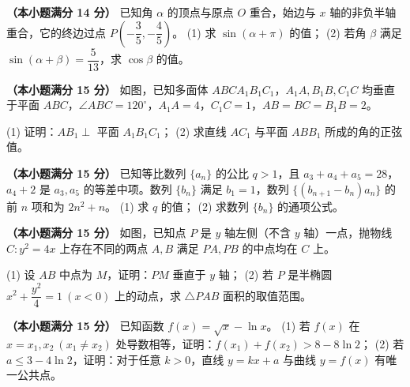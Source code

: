 \begin{question}
\textbf{（本小题满分 14 分）} 
已知角 $\alpha$ 的顶点与原点 $O$ 重合，始边与 $x$ 轴的非负半轴重合，它的终边过点 $P\left(-\dfrac35, -\dfrac45\right)$。
(1) 求 $\sin(\alpha + \pi)$ 的值；
(2) 若角 $\beta$ 满足 $\sin(\alpha + \beta) = \dfrac{5}{13}$，求 $\cos\beta$ 的值。

\Needspace{0.4\textheight}
\end{question}
\begin{question}
\textbf{（本小题满分 15 分）} 
如图，已知多面体 $ABCA_1B_1C_1$，$A_1A, B_1B, C_1C$ 均垂直于平面 $ABC$，$\angle ABC = 120^\circ$，$A_1A = 4$，$C_1C = 1$，$AB = BC = B_1B = 2$。
\nopagebreak[4]
\begin{center}\end{center}
\nopagebreak[4]
(1) 证明：$AB_1 \perp$ 平面 $A_1B_1C_1$；
(2) 求直线 $AC_1$ 与平面 $ABB_1$ 所成的角的正弦值。

\end{question}
\begin{question}
\textbf{（本小题满分 15 分）} 
已知等比数列 $\{a_n\}$ 的公比 $q > 1$，且 $a_3 + a_4 + a_5 = 28$，$a_4 + 2$ 是 $a_3, a_5$ 的等差中项。数列 $\{b_n\}$ 满足 $b_1 = 1$，数列 $\{(b_{n+1} - b_n)a_n\}$ 的前 $n$ 项和为 $2n^2 + n$。
(1) 求 $q$ 的值；
(2) 求数列 $\{b_n\}$ 的通项公式。

\Needspace{0.4\textheight}
\end{question}
\begin{question}
\textbf{（本小题满分 15 分）} 
如图，已知点 $P$ 是 $y$ 轴左侧（不含 $y$ 轴）一点，抛物线 $C\colon y^2 = 4x$ 上存在不同的两点 $A, B$ 满足 $PA, PB$ 的中点均在 $C$ 上。
\nopagebreak[4]
\begin{center}\end{center}
\nopagebreak[4]
(1) 设 $AB$ 中点为 $M$，证明：$PM$ 垂直于 $y$ 轴；
(2) 若 $P$ 是半椭圆 $x^2 + \dfrac{y^2}{4} = 1\ (x < 0)$ 上的动点，求 $\triangle PAB$ 面积的取值范围。

\end{question}
\begin{question}
\textbf{（本小题满分 15 分）} 
已知函数 $f(x) = \sqrt x - \ln x$。
(1) 若 $f(x)$ 在 $x = x_1, x_2\ (x_1 \neq x_2)$ 处导数相等，证明：$f(x_1) + f(x_2) > 8 - 8\ln 2$；
(2) 若 $a \leqslant 3 - 4\ln 2$，证明：对于任意 $k > 0$，直线 $y = kx + a$ 与曲线 $y = f(x)$ 有唯一公共点。

\end{question}